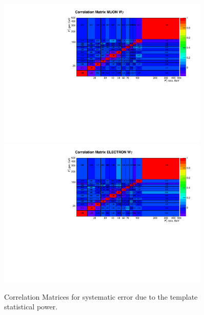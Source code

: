 \begin{figure}[htb]
  \begin{center}
   \includegraphics[width=0.90\textwidth]{../figs/figs_v11/MUON_WGamma/Constants/matrCorrelation_syst_templStat.pdf}\\
\includegraphics[width=0.90\textwidth]{../figs/figs_v11/ELECTRON_WGamma/Constants/matrCorrelation_syst_templStat.pdf}
  \caption{Correlation Matrices for systematic error due to the template statistical power.}
  \label{fig:corrMatrices_syst_templStat_Wg}
  \end{center}
\end{figure}

